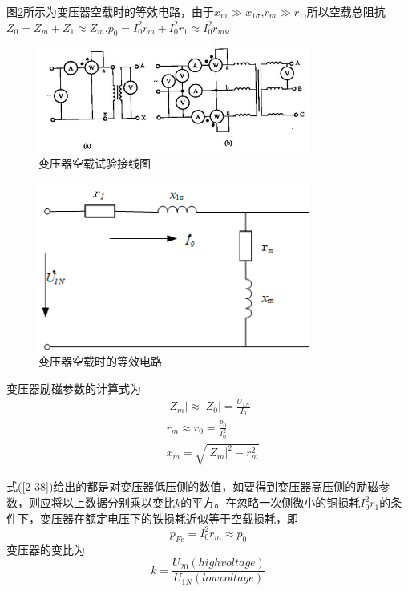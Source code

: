 \documentclass{book}
\begin{document}
图\ref{fig_3.16}所示为变压器空载时的等效电路，由于${{x}_{m}}\gg {{x}_{1\sigma }}$,${{r}_{m}}\gg {{r}_{1}}$,所以空载总阻抗${{Z}_{0}}={{Z}_{m}}+{{Z}_{1}}\approx {{Z}_{m}}$,${{p}_{0}}=I_{0}^{2}{{r}_{m}}+I_{0}^{2}{{r}_{1}}\approx I_{0}^{2}{{r}_{m}}$。
\begin{figure}[H]
	\centering
	\includegraphics[width=0.80\textwidth]{3-15.png}
	\caption{变压器空载试验接线图}
	\label{fig_3.15}
\end{figure}
\begin{figure}[H]
	\centering
	\includegraphics[width=0.80\textwidth]{3-16g.png}
	\caption{变压器空载时的等效电路}
	\label{fig_3.16}
\end{figure}
变压器励磁参数的计算式为
\begin{equation}
\begin{aligned}
& \left| {{Z}_{m}} \right|\approx \left| {{Z}_{0}} \right|=\frac{{{U}_{1N}}}{{{I}_{0}}} \\ 
& {{r}_{m}}\approx {{r}_{0}}=\frac{{{p}_{0}}}{I_{0}^{2}} \\ 
& {{x}_{m}}=\sqrt{{{\left| {{Z}_{m}} \right|}^{2}}-r_{m}^{2}} 
\end{aligned}
\label{2-38}
\end{equation}

式(\ref{2-38})给出的都是对变压器低压侧的数值，如要得到变压器高压侧的励磁参数，则应将以上数据分别乘以变比$k$的平方。在忽略一次侧微小的铜损耗$I_{0}^{2}{{r}_{1}}$的条件下，变压器在额定电压下的铁损耗近似等于空载损耗，即
\begin{equation}
{{p}_{Fe}}=I_{0}^{2}{{r}_{m}}\approx {{p}_{0}}
\label{2-39}
\end{equation}
变压器的变比为
\begin{equation}
k=\frac{{{U}_{20}}(high voltage)}{{{U}_{1N}}( low voltage)}
\label{2-40}
\end{equation}
\end{document}
